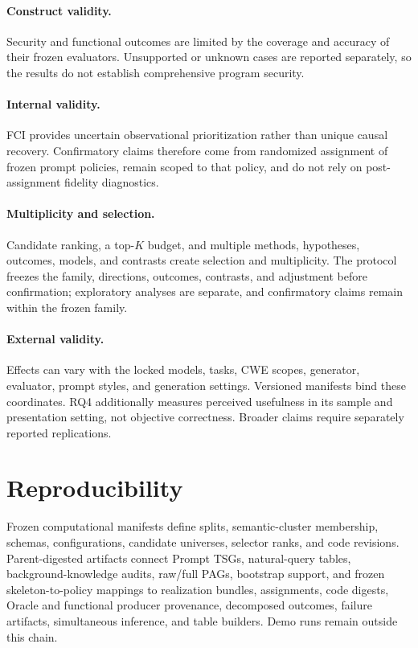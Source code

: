 \documentclass[acmsmall,screen,review,anonymous]{acmart}
\begin{document}
\paragraph{Construct validity.}
Security and functional outcomes are limited by the coverage and accuracy of
their frozen evaluators. Unsupported or unknown cases are reported separately,
so the results do not establish comprehensive program security.

\paragraph{Internal validity.}
FCI provides uncertain observational prioritization rather than unique causal
recovery. Confirmatory claims therefore come from randomized assignment of
frozen prompt policies, remain scoped to that policy, and do not rely on
post-assignment fidelity diagnostics.

\paragraph{Multiplicity and selection.}
Candidate ranking, a top-$K$ budget, and multiple methods, hypotheses, outcomes,
models, and contrasts create selection and multiplicity. The protocol freezes
the family, directions, outcomes, contrasts, and adjustment before confirmation;
exploratory analyses are separate, and confirmatory claims remain within the
frozen family.

\paragraph{External validity.}
Effects can vary with the locked models, tasks, CWE scopes, generator,
evaluator, prompt styles, and generation settings. Versioned manifests bind
these coordinates. RQ4 additionally measures perceived usefulness in its
sample and presentation setting, not objective correctness. Broader claims
require separately reported replications.

\section{Reproducibility}

Frozen computational manifests define splits, semantic-cluster membership,
schemas, configurations, candidate universes, selector ranks, and code
revisions. Parent-digested artifacts connect Prompt TSGs, natural-query tables,
background-knowledge audits, raw/full PAGs, bootstrap support, and frozen
skeleton-to-policy mappings to realization bundles, assignments, code digests,
Oracle and functional producer provenance, decomposed outcomes, failure
artifacts, simultaneous inference, and table builders. Demo runs remain
outside this chain.
\end{document}
